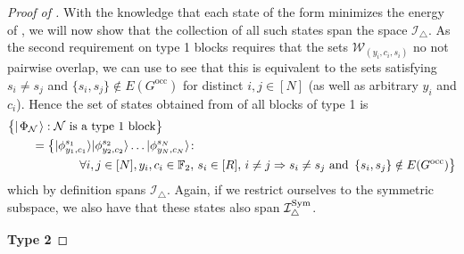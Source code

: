\documentclass[../thesis-main/thesis-main]{subfiles}
\begin{document}
\begin{proof}[Proof of \protect{}]
With the knowledge that each state of the form  minimizes the energy of , we will now show that the collection of all such states span the space $\mathcal{I}_{\triangle}$.  As the second requirement on type 1 blocks requires that the sets $\mathcal{W}_{(y_i,c_i,s_i)}$ no not pairwise overlap, we can use  to see that this is equivalent to the sets satisfying $s_{i}\neq s_{j}$ and $\{s_{i},s_{j}\}\notin E(G^{\text{occ}})$ for distinct $i,j\in[N]$ (as well as arbitrary $y_i$ and $c_i$). Hence the set of states  obtained from of all blocks of type 1 is 
\begin{align}
  &\big\{ |\mspace{2mu} \Phi_\mathcal{N} \mspace{2mu} \rangle : \mathcal{N} \text{ is a type 1 block}\big\}\nonumber\\
  &\qquad=\big\{|\phi_{y_{1},c_{1}}^{s_{1}}\rangle|\phi_{y_{2},c_{2}}^{s_{2}}\rangle\ldots|\phi_{y_{N},c_{N}}^{s_{N}}\rangle\colon \nonumber\\
  &\qquad\qquad\qquad\forall i,j\in [N], y_{i},c_{i}\in\mathbb{F}_2,\, s_{i}\in[R],\, i\neq j \Rightarrow s_{i}\neq s_{j}\text{ and }\,\{s_{i},s_{j}\}\notin E(G^{\text{occ}})\big\} 
\end{align}
which by definition spans $\mathcal{I}_{\triangle}$.  Again, if we restrict ourselves to the symmetric subspace, we also have that these states also span $\mathcal{I}_{\triangle}^{\operatorname{Sym}}$.

\medskip

\noindent \textbf{Type 2}

\smallskip


\end{proof}
\end{document}
